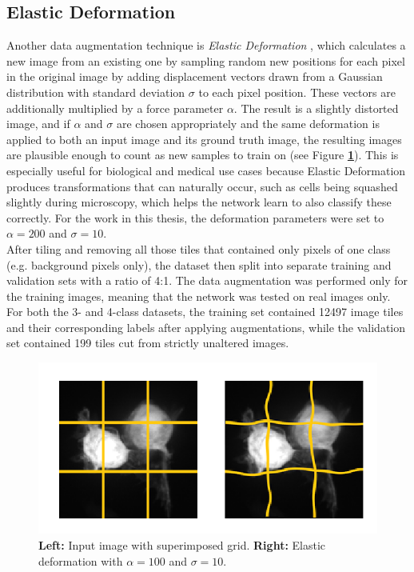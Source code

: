 		\subsection{Elastic Deformation}
Another data augmentation technique is \textit{Elastic Deformation} \cite{elastic}, which calculates a new image from an existing one by sampling random new positions for each pixel in the original image by adding displacement vectors drawn from a Gaussian distribution with standard deviation $\sigma$ to each pixel position. These vectors are additionally multiplied by a force parameter $\alpha$. The result is a slightly distorted image, and if $\alpha$ and $\sigma$ are chosen appropriately and the same deformation is applied to both an input image and its ground truth image, the resulting images are plausible enough to count as new samples to train on (see Figure \textbf{\ref{fig:elastic}}). This is especially useful for biological and medical use cases because Elastic Deformation produces transformations that can naturally occur, such as cells being squashed slightly during microscopy, which helps the network learn to also classify these correctly. For the work in this thesis, the deformation parameters were set to $\alpha = 200$ and $\sigma = 10$.\\

\noindent After tiling and removing all those tiles that contained only pixels of one class (e.g. background pixels only), the dataset then split into separate training and validation sets with a ratio of 4:1. The data augmentation was performed only for the training images, meaning that the network was tested on real images only. For both the 3- and 4-class datasets, the training set contained 12497 image tiles and their corresponding labels after applying augmentations, while the validation set contained 199 tiles cut from strictly unaltered images.


\begin {figure}[!htb]
	\begin{center}
		\includegraphics[scale=0.80]{img/fig_elastic.png}
	\end{center}
	\caption[Elastic deformation.]{\textbf{Left:} Input image with superimposed grid. \textbf{Right:} Elastic deformation with $\alpha = 100$ and $\sigma = 10$.}
	\label{fig:elastic}
\end {figure}


